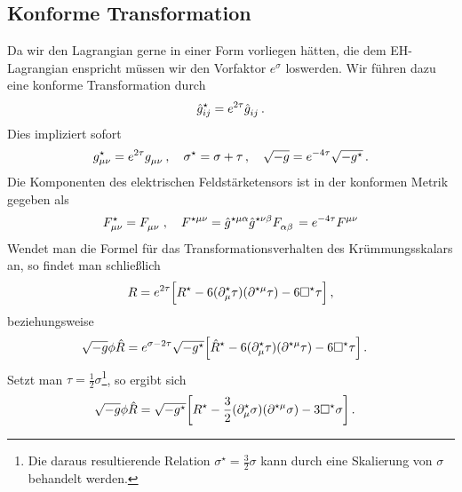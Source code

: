 \subsection{Konforme Transformation}
Da wir den Lagrangian gerne in einer Form vorliegen hätten, die dem
EH-Lagrangian enspricht müssen wir den Vorfaktor $e^{\sigma}$ loswerden. 
Wir führen dazu eine konforme Transformation durch
\begin{equation}
\tensor*{\hat{g}}{*^\star*_i*_j}=e^{2\tau}\tensor{\hat{g}}{_i_j}\,.
\end{equation}
Dies impliziert sofort
\begin{equation}
\tensor*{g}{*^\star*_\mu*_\nu}=e^{2\tau}\tensor{g}{_\mu_\nu}\,,\quad\sigma^\star
=\sigma+\tau\,,\quad \sqrt{-g}=e^{-4\tau}\sqrt{-g^\star}\,.
\end{equation}
Die Komponenten des elektrischen Feldstärketensors ist in der konformen Metrik
gegeben als
\begin{equation}
\tensor*{F}{*^\star_\mu_\nu}=\tensor{F}{_\mu_\nu}\,,\quad\tensor*{F}{*^\star^\mu^\nu}
=\tensor*{\hat{g}}{*^\star*^\mu*^\alpha}\tensor*{\hat{g}}{*^\star*^\nu*^\beta}\tensor{F}{_\alpha_\beta}
=e^{-4\tau}\tensor{F}{^\mu^\nu}
\end{equation}
Wendet man die Formel für das Transformationsverhalten des Krümmungsskalars an,
so findet man schließlich
\begin{equation}
R=e^{2\tau}\left[R^\star-6(\tensor*{\partial}{^\star_\mu}\tau)(\tensor{\partial}{^\star^\mu}\tau)
-6\square^\star\tau\right]\,,
\end{equation}
beziehungsweise
\begin{equation}
\begin{split}
\sqrt{-g}\phi
\hat{R}
&=e^{\sigma-2\tau}\sqrt{-g^\star}\left[\hat{R}^\star
-6(\tensor*{\partial}{^\star_\mu}\tau)(\tensor{\partial}{^\star^\mu}\tau)
-6\square^\star\tau\right]\,.
\end{split}
\end{equation}
Setzt man $\tau = \frac{1}{2}\sigma$\footnote{Die daraus resultierende
Relation $\sigma^\star=\frac{3}{2}\sigma$ kann durch eine Skalierung von
$\sigma$ behandelt werden.}, so ergibt sich
\begin{equation}
\begin{split}
\sqrt{-g}\phi
\hat{R}&=\sqrt{-g^\star}\left[R^\star
-\frac{3}{2}(\tensor*{\partial}{^\star_\mu}\sigma)(\tensor{\partial}{^\star^\mu}\sigma)
-3\square^\star\sigma\right]\,.
\end{split}
\end{equation}
